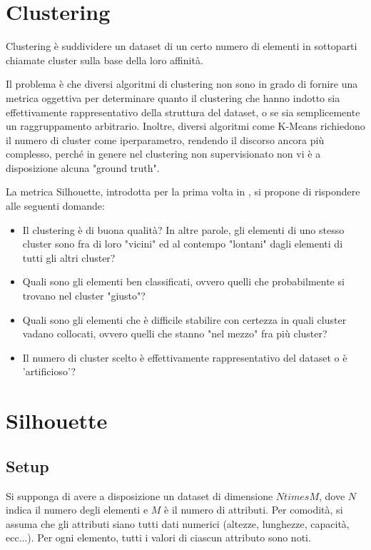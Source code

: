 \documentclass[italian]{article}
\begin{document}
	\section{Clustering}

		Clustering è suddividere un dataset di un certo numero di elementi
		in sottoparti chiamate cluster sulla base della loro affinità.

		Il problema è che diversi algoritmi di clustering non sono in grado di
		fornire una metrica oggettiva per determinare quanto il clustering che
		hanno indotto sia effettivamente rappresentativo della struttura del
		dataset, o se sia semplicemente un raggruppamento arbitrario. Inoltre,
		diversi algoritmi come K-Means richiedono il numero di cluster come
		iperparametro, rendendo il discorso ancora più complesso, perché in
		genere nel clustering non supervisionato non vi è a disposizione
		alcuna "ground truth".

		La metrica Silhouette, introdotta per la prima volta in \cite{ROUSSEEUW198753},
		si propone di rispondere alle seguenti domande:

		\begin{itemize}
			\item
			Il clustering è di buona qualità? In altre parole, gli elementi di
			uno stesso cluster sono fra di loro "vicini" ed al contempo "lontani"
			dagli elementi di tutti gli altri cluster?
			\item
			Quali sono gli elementi ben classificati, ovvero quelli che probabilmente
			si trovano nel cluster "giusto"?
			\item
			Quali sono gli elementi che è difficile stabilire con certezza in quali
			cluster vadano collocati, ovvero quelli che stanno "nel mezzo" fra più
			cluster?
			\item
			Il numero di cluster scelto è effettivamente rappresentativo del dataset
			o è 'artificioso'?
		\end{itemize}

	\section{Silhouette}

		\subsection{Setup}

			Si supponga di avere a disposizione un dataset di dimensione
			$N times M$, dove $N$ indica il numero degli elementi e $M$ è
			il numero di attributi. Per comodità, si assuma che gli attributi
			siano tutti dati numerici (altezze, lunghezze, capacità, ecc...).
			Per ogni elemento, tutti i valori di ciascun attributo sono noti.
\end{document}
